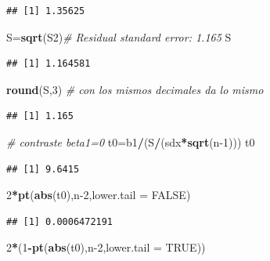 \documentclass[
]{article}
\newenvironment{Shaded}{\begin{snugshade}}{\end{snugshade}}
\newcommand{\CommentTok}[1]{\textcolor[rgb]{0.56,0.35,0.01}{\textit{#1}}}
\newcommand{\DataTypeTok}[1]{\textcolor[rgb]{0.13,0.29,0.53}{#1}}
\newcommand{\DecValTok}[1]{\textcolor[rgb]{0.00,0.00,0.81}{#1}}
\newcommand{\KeywordTok}[1]{\textcolor[rgb]{0.13,0.29,0.53}{\textbf{#1}}}
\newcommand{\NormalTok}[1]{#1}
\newcommand{\OperatorTok}[1]{\textcolor[rgb]{0.81,0.36,0.00}{\textbf{#1}}}
\newcommand{\OtherTok}[1]{\textcolor[rgb]{0.56,0.35,0.01}{#1}}
\begin{document}
\begin{verbatim}
## [1] 1.35625
\end{verbatim}

\begin{Shaded}
\begin{Highlighting}[]
\NormalTok{S=}\KeywordTok{sqrt}\NormalTok{(S2)}\CommentTok{\# Residual standard error: 1.165}
\NormalTok{S}
\end{Highlighting}
\end{Shaded}

\begin{verbatim}
## [1] 1.164581
\end{verbatim}

\begin{Shaded}
\begin{Highlighting}[]
\KeywordTok{round}\NormalTok{(S,}\DecValTok{3}\NormalTok{) }\CommentTok{\# con los mismos decimales da lo mismo}
\end{Highlighting}
\end{Shaded}

\begin{verbatim}
## [1] 1.165
\end{verbatim}

\begin{Shaded}
\begin{Highlighting}[]
 \CommentTok{\# contraste beta1=0}
\NormalTok{t0=b1}\OperatorTok{/}\NormalTok{(S}\OperatorTok{/}\NormalTok{(sdx}\OperatorTok{*}\KeywordTok{sqrt}\NormalTok{(n}\DecValTok{{-}1}\NormalTok{)))}
\NormalTok{t0}
\end{Highlighting}
\end{Shaded}

\begin{verbatim}
## [1] 9.6415
\end{verbatim}

\begin{Shaded}
\begin{Highlighting}[]
\DecValTok{2}\OperatorTok{*}\KeywordTok{pt}\NormalTok{(}\KeywordTok{abs}\NormalTok{(t0),n}\DecValTok{{-}2}\NormalTok{,}\DataTypeTok{lower.tail =} \OtherTok{FALSE}\NormalTok{)}
\end{Highlighting}
\end{Shaded}

\begin{verbatim}
## [1] 0.0006472191
\end{verbatim}

\begin{Shaded}
\begin{Highlighting}[]
\DecValTok{2}\OperatorTok{*}\NormalTok{(}\DecValTok{1}\OperatorTok{{-}}\KeywordTok{pt}\NormalTok{(}\KeywordTok{abs}\NormalTok{(t0),n}\DecValTok{{-}2}\NormalTok{,}\DataTypeTok{lower.tail =} \OtherTok{TRUE}\NormalTok{))}
\end{Highlighting}
\end{Shaded}
\end{document}
